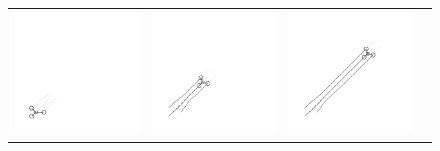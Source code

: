 \documentclass[letterpaper, 10 pt, conference]{ieeeconf}
\begin{document}
\begin{figure}[t]
	\centering
	\setlength{\tabcolsep}{0.1em}
	\begin{tabular}[t]{|c|c|c|c|}
		\hline
			\includegraphics[scale=0.65]{figures/holonomic_0_tikz_gray.pdf} &
			\includegraphics[scale=0.65]{figures/holonomic_1_tikz_gray.pdf} &
			\includegraphics[scale=0.65]{figures/holonomic_2_tikz_gray.pdf} &

\end{tabular}
\end{figure}
\end{document}
